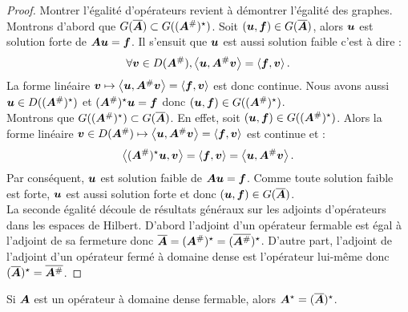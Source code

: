 \begin{proof}
	\begin{sloppypar}
	Montrer l'égalité d'opérateurs revient à démontrer l'égalité des graphes.
	Montrons d'abord que $G(\overline{\bm{A}}) \subset G((\bm{A}^{\#})^\star)$.
	Soit $(\bm{u} , \bm{f}) \in G(\overline{\bm{A}})$,
	alors $\bm{u}$ est solution forte de $\bm{A} \bm{u} = \bm{f}$.
	Il s'ensuit que $\bm{u}$ est aussi solution faible c'est à dire :
	\begin{align}
		\forall \bm{v} \in D(\bm{A}^{\#}),
		\left\langle \bm{u} , \bm{A}^{\#} \bm{v} \right\rangle =
		\left\langle \bm{f} , \bm{v} \right\rangle .
	\end{align}
	La forme linéaire $\bm{v} \mapsto
	\left\langle \bm{u} , \bm{A}^{\#} \bm{v} \right\rangle =
	\left\langle \bm{f} , \bm{v} \right\rangle$
	est donc continue. Nous avons aussi $\bm{u} \in D((\bm{A}^{\#})^\star)$
	et $(\bm{A}^{\#})^\star \bm{u} = \bm{f}$
	donc $(\bm{u} , \bm{f}) \in G((\bm{A}^{\#})^\star)$.
	\\
	Montrons que $G((\bm{A}^{\#})^\star) \subset G(\overline{\bm{A}})$.
	En effet, soit $(\bm{u} , \bm{f}) \in G((\bm{A}^{\#})^\star)$.
	Alors la forme linéaire $\bm{v} \in D(\bm{A}^{\#}) \mapsto
	\left\langle \bm{u} , \bm{A}^{\#} \bm{v} \right\rangle =
	\left\langle \bm{f} , \bm{v} \right\rangle$
	est continue et :
	\begin{align}
		\left\langle (\bm{A}^{\#})^\star \bm{u} , \bm{v} \right\rangle =
		\left\langle \bm{f} , \bm{v} \right\rangle =
		\left\langle \bm{u} , \bm{A}^{\#} \bm{v} \right\rangle .
	\end{align}
	Par conséquent, $\bm{u}$ est solution faible de $\bm{A} \bm{u} = \bm{f}$.
	Comme toute solution faible est forte, $\bm{u}$ est aussi solution forte
	et donc $(\bm{u} , \bm{f}) \in G(\overline{\bm{A}})$.
	\\
	La seconde égalité découle de résultats généraux sur les adjoints
	d'opérateurs dans les espaces de Hilbert. D'abord l'adjoint d'un
	opérateur fermable est égal à l'adjoint de sa fermeture donc
	$\overline{\bm{A}} = (\bm{A}^{\#})^\star = (\overline{\bm{A}^{\#}})^\star$.
	D'autre part, l'adjoint de l'adjoint d'un opérateur fermé à domaine
	dense est l'opérateur lui-même donc $(\overline{\bm{A}})^\star = \overline{\bm{A}^{\#}}$.
	\end{sloppypar}
\end{proof}

\begin{proposition}
	Si $\bm{A}$ est un opérateur à domaine dense fermable,
	alors $\bm{A}^\star = (\overline{\bm{A}})^\star$.
\end{proposition}

